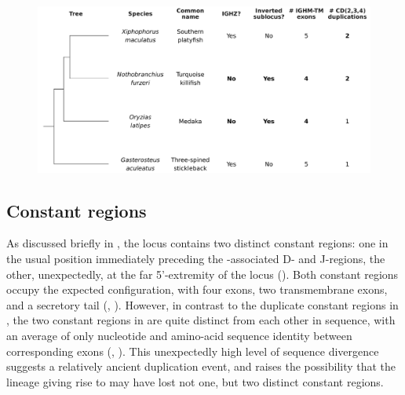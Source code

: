 \begin{figure}
\centering
\includegraphics[width=\textwidth]{_Figures/png/species-tree-small}
\vspace{0.5em}
\label{fig:species-tree-small}
\end{figure}
	
\subsection{Constant regions}
\label{sec:xma-locus-constant}
	
As discussed briefly in , the \Xma \igh{} locus contains two distinct  constant regions: one in the usual position immediately preceding the -associated D- and J-regions, the other, unexpectedly, at the far 5'-extremity of the locus (). Both  constant regions occupy the expected configuration, with four \cz{} exons, two transmembrane exons, and a secretory tail (, ). However, in contrast to the duplicate constant regions in \Nfu, the two  constant regions in \Xma are quite distinct from each other in sequence, with an average of only  nucleotide and  amino-acid sequence identity between corresponding \cz{} exons (, ). This unexpectedly high level of sequence divergence suggests a relatively ancient duplication event, and raises the possibility that the lineage giving rise to \Nfu may have lost not one, but two distinct  constant regions.
	
